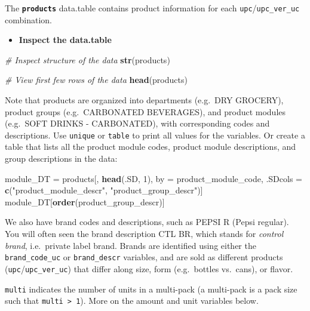 \documentclass[
]{article}
\newenvironment{Shaded}{\begin{snugshade}}{\end{snugshade}}
\newcommand{\CommentTok}[1]{\textcolor[rgb]{0.56,0.35,0.01}{\textit{#1}}}
\newcommand{\DecValTok}[1]{\textcolor[rgb]{0.00,0.00,0.81}{#1}}
\newcommand{\FunctionTok}[1]{\textcolor[rgb]{0.13,0.29,0.53}{\textbf{#1}}}
\newcommand{\NormalTok}[1]{#1}
\newcommand{\OtherTok}[1]{\textcolor[rgb]{0.56,0.35,0.01}{#1}}
\newcommand{\StringTok}[1]{\textcolor[rgb]{0.31,0.60,0.02}{#1}}
\providecommand{\tightlist}{%
  \setlength{\itemsep}{0pt}\setlength{\parskip}{0pt}}
\begin{document}
The \textbf{\texttt{products}} data.table contains product information
for each \texttt{upc}/\texttt{upc\_ver\_uc} combination.

\begin{itemize}
\tightlist
\item
  \textbf{Inspect the data.table}
\end{itemize}

\begin{Shaded}
\begin{Highlighting}[]
\CommentTok{\# Inspect structure of the data}
\FunctionTok{str}\NormalTok{(products)}

\CommentTok{\# View first few rows of the data}
\FunctionTok{head}\NormalTok{(products)}
\end{Highlighting}
\end{Shaded}

Note that products are organized into departments (e.g.~DRY GROCERY),
product groups (e.g.~CARBONATED BEVERAGES), and product modules
(e.g.~SOFT DRINKS - CARBONATED), with corresponding codes and
descriptions. Use \texttt{unique} or \texttt{table} to print all values
for the variables. Or create a table that lists all the product module
codes, product module descriptions, and group descriptions in the data:

\begin{Shaded}
\begin{Highlighting}[]
\NormalTok{module\_DT }\OtherTok{=}\NormalTok{ products[, }\FunctionTok{head}\NormalTok{(.SD, }\DecValTok{1}\NormalTok{), by }\OtherTok{=}\NormalTok{ product\_module\_code,}
\NormalTok{                       .SDcols }\OtherTok{=} \FunctionTok{c}\NormalTok{(}\StringTok{"product\_module\_descr"}\NormalTok{, }\StringTok{"product\_group\_descr"}\NormalTok{)]}
\NormalTok{module\_DT[}\FunctionTok{order}\NormalTok{(product\_group\_descr)]}
\end{Highlighting}
\end{Shaded}

We also have brand codes and descriptions, such as PEPSI R (Pepsi
regular). You will often seen the brand description CTL BR, which stands
for \emph{control brand}, i.e.~private label brand. Brands are
identified using either the \texttt{brand\_code\_uc} or
\texttt{brand\_descr} variables, and are sold as different products
(\texttt{upc}/\texttt{upc\_ver\_uc}) that differ along size, form
(e.g.~bottles vs.~cans), or flavor.

\texttt{multi} indicates the number of units in a multi-pack (a
multi-pack is a pack size such that \texttt{multi\ \textgreater{}\ 1}).
More on the amount and unit variables below.
\end{document}
